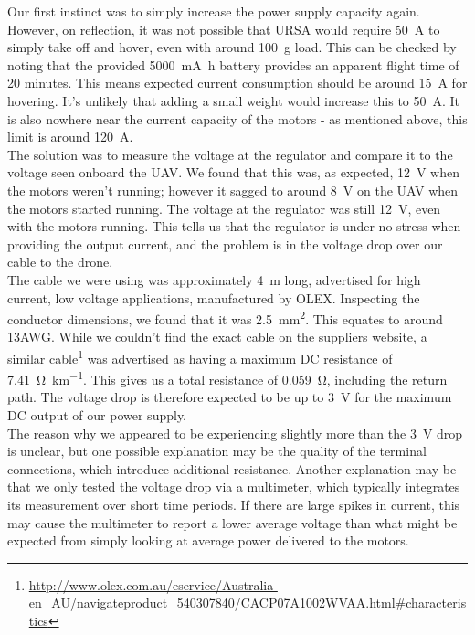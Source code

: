 \documentclass[capstone_report.tex]{subfiles}
\begin{document}
Our first instinct was to simply increase the power supply capacity again. However, on reflection, it was not possible that URSA would require \SI{50}{\ampere} to simply take off and hover, even with around \SI{100}{\gram} load. This can be checked by noting that the provided \SI{5000}{\milli\ampere\hour} battery provides an apparent flight time of 20 minutes. This means expected current consumption should be around \SI{15}{\ampere} for hovering. It's unlikely that adding a small weight would increase this to \SI{50}{\ampere}. It is also nowhere near the current capacity of the motors - as mentioned above, this limit is around \SI{120}{\ampere}.\\

The solution was to measure the voltage at the regulator and compare it to the voltage seen onboard the UAV. We found that this was, as expected, \SI{12}{\volt} when the motors weren't running; however it sagged to around \SI{8}{\volt} on the UAV when the motors started running. The voltage at the regulator was still \SI{12}{\volt}, even with the motors running. This tells us that the regulator is under no stress when providing the output current, and the problem is in the voltage drop over our cable to the drone. \\

The cable we were using was approximately \SI{4}{\meter} long, advertised for high current, low voltage applications, manufactured by OLEX. Inspecting the conductor dimensions, we found that it was \SI{2.5}{\milli\metre\squared}. This equates to around 13AWG. While we couldn't find the exact cable on the suppliers website, a similar cable\footnote{\url{http://www.olex.com.au/eservice/Australia-en_AU/navigateproduct_540307840/CACP07A1002WVAA.html\#characteristics}} was advertised as having a maximum DC resistance of \SI{7.41}{\ohm\per\kilo\metre}. This gives us a total resistance of \SI{0.059}{\ohm}, including the return path. The voltage drop is therefore expected to be up to \SI{3}{\volt} for the maximum DC output of our power supply.\\

The reason why we appeared to be experiencing slightly more than the \SI{3}{\volt} drop is unclear, but one possible explanation may be the quality of the terminal connections, which introduce additional resistance. Another explanation may be that we only tested the voltage drop via a multimeter, which typically integrates its measurement over short time periods. If there are large spikes in current, this may cause the multimeter to report a lower average voltage than what might be expected from simply looking at average power delivered to the motors. \\
\end{document}
